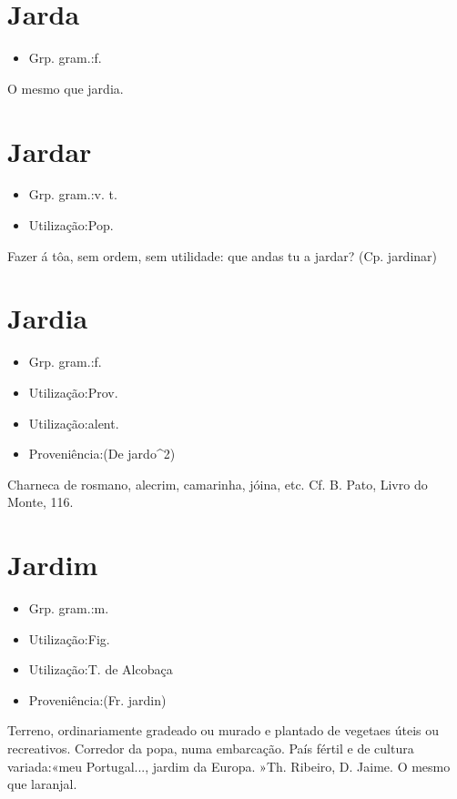 \documentclass{article}
\begin{document}
\section{Jarda}
\begin{itemize}
\item {Grp. gram.:f.}
\end{itemize}
O mesmo que \textunderscore jardia\textunderscore .
\section{Jardar}
\begin{itemize}
\item {Grp. gram.:v. t.}
\end{itemize}
\begin{itemize}
\item {Utilização:Pop.}
\end{itemize}
Fazer á tôa, sem ordem, sem utilidade: \textunderscore que andas tu a jardar\textunderscore ?
(Cp. \textunderscore jardinar\textunderscore )
\section{Jardia}
\begin{itemize}
\item {Grp. gram.:f.}
\end{itemize}
\begin{itemize}
\item {Utilização:Prov.}
\end{itemize}
\begin{itemize}
\item {Utilização:alent.}
\end{itemize}
\begin{itemize}
\item {Proveniência:(De \textunderscore jardo\textunderscore ^2)}
\end{itemize}
Charneca de rosmano, alecrim, camarinha, jóina, etc. Cf. B. Pato, \textunderscore Livro do Monte\textunderscore , 116.
\section{Jardim}
\begin{itemize}
\item {Grp. gram.:m.}
\end{itemize}
\begin{itemize}
\item {Utilização:Fig.}
\end{itemize}
\begin{itemize}
\item {Utilização:T. de Alcobaça}
\end{itemize}
\begin{itemize}
\item {Proveniência:(Fr. \textunderscore jardin\textunderscore )}
\end{itemize}
Terreno, ordinariamente gradeado ou murado e plantado de vegetaes úteis ou recreativos.
Corredor da popa, numa embarcação.
País fértil e de cultura variada:«\textunderscore meu Portugal..., jardim da Europa\textunderscore . »Th. Ribeiro, \textunderscore D. Jaime\textunderscore .
O mesmo que \textunderscore laranjal\textunderscore .
\end{document}

